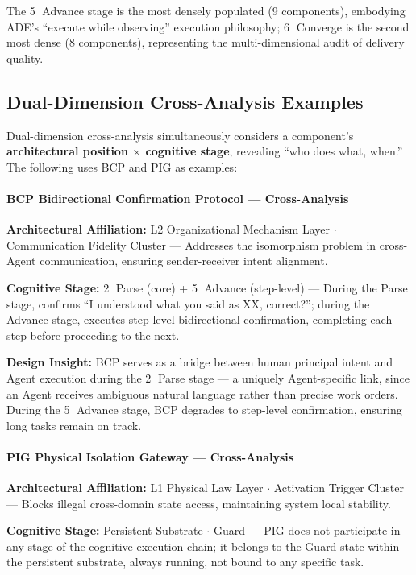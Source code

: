 \documentclass[11pt,a4paper]{article}
\begin{document}
The \textcircled{5} Advance stage is the most densely populated (9 components), embodying ADE's ``execute while observing'' execution philosophy; \textcircled{6} Converge is the second most dense (8 components), representing the multi-dimensional audit of delivery quality.

\subsection{Dual-Dimension Cross-Analysis Examples}
\label{sec:9.4}

Dual-dimension cross-analysis simultaneously considers a component's \textbf{architectural position $\times$ cognitive stage}, revealing ``who does what, when.'' The following uses BCP and PIG as examples:

\paragraph{BCP Bidirectional Confirmation Protocol --- Cross-Analysis}
\textbf{Architectural Affiliation:} L2 Organizational Mechanism Layer $\cdot$ Communication Fidelity Cluster --- Addresses the isomorphism problem in cross-Agent communication, ensuring sender-receiver intent alignment.

\textbf{Cognitive Stage:} \textcircled{2} Parse (core) + \textcircled{5} Advance (step-level) --- During the Parse stage, confirms ``I understood what you said as XX, correct?''; during the Advance stage, executes step-level bidirectional confirmation, completing each step before proceeding to the next.

\textbf{Design Insight:} BCP serves as a bridge between human principal intent and Agent execution during the \textcircled{2} Parse stage --- a uniquely Agent-specific link, since an Agent receives ambiguous natural language rather than precise work orders. During the \textcircled{5} Advance stage, BCP degrades to step-level confirmation, ensuring long tasks remain on track.

\paragraph{PIG Physical Isolation Gateway --- Cross-Analysis}
\textbf{Architectural Affiliation:} L1 Physical Law Layer $\cdot$ Activation Trigger Cluster --- Blocks illegal cross-domain state access, maintaining system local stability.

\textbf{Cognitive Stage:} Persistent Substrate $\cdot$ Guard --- PIG does not participate in any stage of the cognitive execution chain; it belongs to the Guard state within the persistent substrate, always running, not bound to any specific task.
\end{document}
